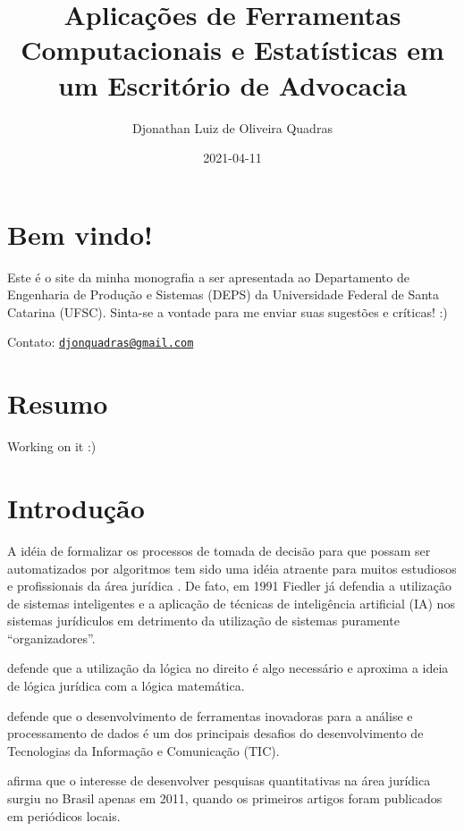 \documentclass[
]{book}
\title{Aplicações de Ferramentas Computacionais e Estatísticas em um Escritório de Advocacia}
\author{Djonathan Luiz de Oliveira Quadras}
\date{2021-04-11}
\begin{document}
\maketitle

{
\setcounter{tocdepth}{1}
\tableofcontents
}
\hypertarget{bem-vindo}{%
\chapter*{Bem vindo!}\label{bem-vindo}}

Este é o site da minha monografia a ser apresentada ao Departamento de Engenharia de Produção e Sistemas (DEPS) da Universidade Federal de Santa Catarina (UFSC). Sinta-se a vontade para me enviar suas sugestões e críticas! :)

Contato: \href{mailto:djonquadras@gmail.com}{\nolinkurl{djonquadras@gmail.com}}

\hypertarget{resumo}{%
\chapter*{Resumo}\label{resumo}}

Working on it :)

\hypertarget{introduuxe7uxe3o}{%
\chapter{Introdução}\label{introduuxe7uxe3o}}

A idéia de formalizar os processos de tomada de decisão para que possam ser automatizados por algoritmos tem sido uma idéia atraente para muitos estudiosos e profissionais da área jurídica \citep{Waltl2018, liu2004}. De fato, em 1991 Fiedler já defendia a utilização de sistemas inteligentes e a aplicação de técnicas de inteligência artificial (IA) nos sistemas jurídiculos em detrimento da utilização de sistemas puramente ``organizadores''.

\citet{Fiedler1991} defende que a utilização da lógica no direito é algo necessário e aproxima a ideia de lógica jurídica com a lógica matemática.

\citet{Guarino2019} defende que o desenvolvimento de ferramentas inovadoras para a análise e processamento de dados é um dos principais desafios do desenvolvimento de Tecnologias da Informação e Comunicação (TIC).

\citet{Colombo2017} afirma que o interesse de desenvolver pesquisas quantitativas na área jurídica surgiu no Brasil apenas em 2011, quando os primeiros artigos foram publicados em periódicos locais.
\end{document}
